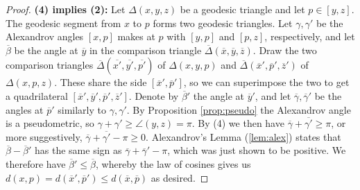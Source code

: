 \documentclass[11pt, a4paper, oneside]{memoir}
\theoremstyle{plain}\newtheorem{theorem}[subsection]{Theorem}
\theoremstyle{definition}
\begin{document}
\begin{proof}
\textbf{(4) implies (2):}
Let \(\Delta(x,y,z)\) be a geodesic triangle and let \(p\in[y,z]\).
The geodesic segment from \(x\) to \(p\) forms two geodesic triangles.
Let \(\gamma,\gamma'\) be the Alexandrov angles \([x,p]\) makes at \(p\) with \([y,p]\) and \([p,z]\), respectively, and let \(\overline{\beta}\) be the angle at \(\overline{y}\) in the comparison triangle \(\overline{\Delta}(\overline{x},\overline{y},\overline{z})\).
Draw the two comparison triangles \(\overline{\Delta}(\overline{x'},\overline{y'},\overline{p'})\) of \(\Delta(x,y,p)\) and \(\overline{\Delta}(\overline{x}',\overline{p}',\overline{z}')\) of \(\Delta(x,p,z)\).
These share the side \([\overline{x}',\overline{p}']\), so we can superimpose the two to get a quadrilateral \([\overline{x}',\overline{y}',\overline{p}',\overline{z}']\).
Denote by \(\overline{\beta}'\) the angle at \(\overline{y}'\), and let \(\overline{\gamma},\overline{\gamma}'\) be the angles at \(\overline{p}'\) similarly to \(\gamma,\gamma'\).
By Proposition \ref{prop:pseudo} the Alexandrov angle is a pseudometric, so \(\gamma+\gamma'\geq\angle(y,z)=\pi\). 
By (4) we then have \(\overline{\gamma}+\overline{\gamma'}\geq\pi\), or more suggestively, \(\overline{\gamma}+\overline{\gamma'}-\pi\geq 0\).
Alexandrov's Lemma (\ref{lem:alex}) states that \(\overline{\beta}-\overline{\beta}'\) has the same sign as \(\overline{\gamma}+\overline{\gamma}'-\pi\), which was just shown to be positive.
We therefore have \(\overline{\beta}'\leq\overline{\beta}\), whereby the law of cosines gives us \(d(x,p)=d(\overline{x}',\overline{p}')\leq d(\overline{x},\overline{p})\) as desired.
\end{proof}



\end{document}
